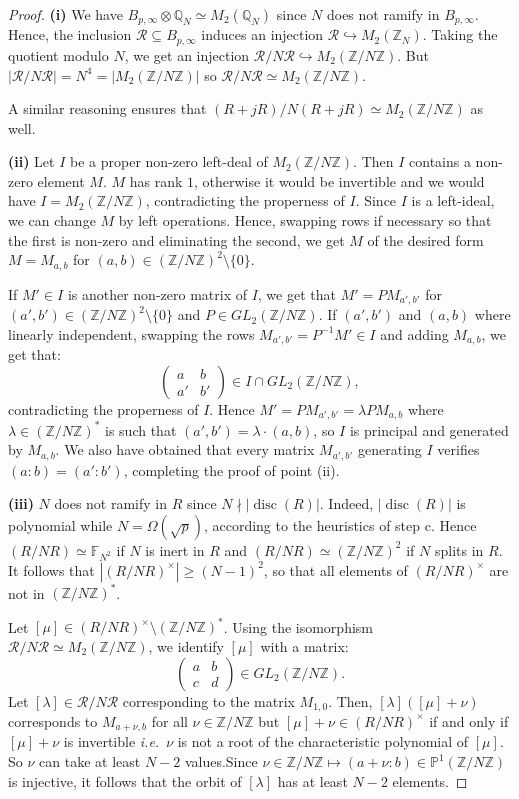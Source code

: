 \documentclass[a4paper,10pt]{report}
\theoremstyle{definition}
\theoremstyle{plain}
\theoremstyle{definition}
\newcommand{\ie}{\emph{i.e.}\ }
\newcommand{\Z}{\mathbb{Z}}
\newcommand{\Q}{\mathbb{Q}}
\newcommand{\F}{\mathbb{F}}
\newcommand{\m}[1]{\mathcal{#1}}
\renewcommand{\(}{\left(}
\renewcommand{\)}{\right)}
\renewcommand{\P}{\mathbb{P}}
\DeclareMathOperator{\disc}{disc}
\begin{document}
\begin{proof}
\textbf{(i)} We have $B_{p,\infty}\otimes\Q_N\simeq M_2(\Q_N)$ since $N$ does not ramify in $B_{p,\infty}$.  Hence, the inclusion $\m{R}\subseteq B_{p,\infty}$ induces an injection $\m{R}\hookrightarrow M_2(\Z_N)$. Taking the quotient modulo $N$, we get an injection $\m{R}/N\m{R}\hookrightarrow M_2(\Z/N\Z)$. But $|\m{R}/N\m{R}|=N^4=|M_2(\Z/N\Z)|$ so $\m{R}/N\m{R}\simeq M_2(\Z/N\Z)$.

A similar reasoning ensures that $(R+jR)/N(R+jR) \simeq M_2(\Z/N\Z)$ as well.

\textbf{(ii)} Let $I$ be a proper non-zero left-deal of $M_2(\Z/N\Z)$. Then $I$ contains a non-zero element $M$. $M$ has rank $1$, otherwise it would be invertible and we would have $I=M_2(\Z/N\Z)$, contradicting the properness of $I$. Since $I$ is a left-ideal, we can change $M$ by left operations. Hence, swapping rows if necessary so that the first is non-zero and eliminating the second, we get $M$ of the desired form $M=M_{a,b}$ for $(a,b)\in(\Z/N\Z)^2\setminus\{0\}$.

If $M'\in I$ is another non-zero matrix of $I$, we get that $M'=PM_{a',b'}$ for $(a',b')\in(\Z/N\Z)^2\setminus\{0\}$ and $P\in GL_2(\Z/N\Z)$. If $(a',b')$ and $(a,b)$ where linearly independent, swapping the rows $M_{a',b'}=P^{-1}M'\in I$ and adding $M_{a,b}$, we get that:
\[\(\begin{array}{cc}
a& b\\
a'& b'
\end{array}\)\in I\cap GL_2(\Z/N\Z),\]
contradicting the properness of $I$. Hence  $M'=PM_{a',b'}=\lambda PM_{a,b}$ where $\lambda\in(\Z/N\Z)^*$ is such that $(a',b')=\lambda\cdot(a,b)$, so $I$ is principal and generated by $M_{a,b}$. We also have obtained that every matrix $M_{a',b'}$ generating $I$ verifies $(a:b)=(a':b')$, completing the proof of point (ii).

\textbf{(iii)} $N$ does not ramify in $R$ since $N\nmid |\disc(R)|$. Indeed, $|\disc(R)|$ is polynomial while $N=\Omega(\sqrt{p})$, according to the heuristics of step c. Hence $(R/NR)\simeq\F_{N^2}$ if $N$ is inert in $R$ and $(R/NR)\simeq(\Z/N\Z)^2$ if $N$ splits in $R$. It follows that $|(R/NR)^\times|\geq (N-1)^2$, so that all elements of $(R/NR)^\times$ are not in $(\Z/N\Z)^*$. 

Let $[\mu]\in (R/NR)^\times\setminus(\Z/N\Z)^*$.  Using the isomorphism $\m{R}/N\m{R}\simeq M_2(\Z/N\Z)$, we identify $[\mu]$ with a matrix:
\[\(\begin{array}{cc}
a & b\\
c & d
\end{array}\)\in GL_2(\Z/N\Z).\]
Let $[\lambda]\in\m{R}/N\m{R}$ corresponding to the matrix $M_{1,0}$. Then, $[\lambda]([\mu]+\nu)$ corresponds to $M_{a+\nu,b}$ for all $\nu\in\Z/N\Z$ but $[\mu]+\nu\in (R/NR)^\times$ if and only if $[\mu]+\nu$ is invertible \ie $\nu$ is not a root of the characteristic polynomial of $[\mu]$. So $\nu$ can take at least $N-2$ values.Since $\nu\in \Z/N\Z\longmapsto (a+\nu:b)\in\P^1(\Z/N\Z)$ is injective, it follows that the orbit of $[\lambda]$ has at least $N-2$ elements.
\end{proof}
\end{document}
